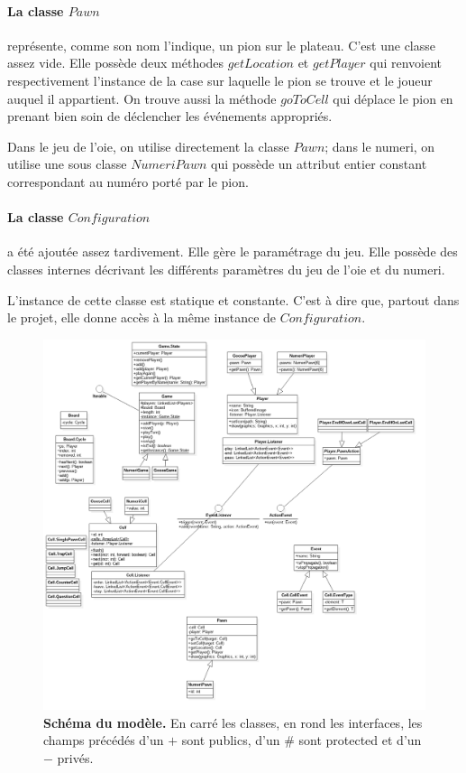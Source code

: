 \documentclass{article}
\begin{document}
\paragraph{La classe $Pawn$} représente, comme son nom l'indique, un pion sur le plateau. C'est une classe assez vide. Elle possède deux méthodes $getLocation$ et $getPlayer$ qui renvoient respectivement l'instance de la case sur laquelle le pion se trouve et le joueur auquel il appartient. On trouve aussi la méthode $goToCell$ qui déplace le pion en prenant bien soin de déclencher les événements appropriés.

Dans le jeu de l'oie, on utilise directement la classe $Pawn$; dans le numeri, on utilise une sous classe $NumeriPawn$ qui possède un attribut entier constant correspondant au numéro porté par le pion.

\paragraph{La classe $Configuration$} a été ajoutée assez tardivement. Elle gère le paramétrage du jeu. Elle possède des classes internes décrivant les différents paramètres du jeu de l'oie et du numeri.

L'instance de cette classe est statique et constante. C'est à dire que, partout dans le projet, elle donne accès à la même instance de $Configuration$.

\begin{figure}
\includegraphics[width=\textwidth]{schema-uml.png}
\caption{
\textbf{Schéma du modèle.}
En carré les classes, en rond les interfaces, les champs précédés d'un $+$ sont publics, d'un $\#$ sont protected et d'un $-$ privés.}
\end{figure}
\end{document}
